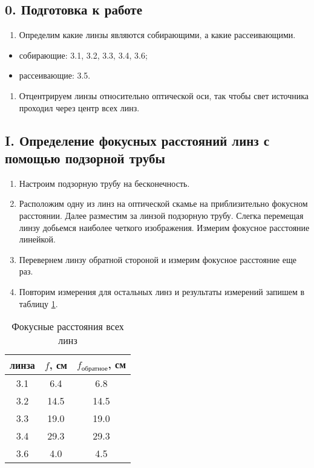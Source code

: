 \documentclass[a4paper,12pt]{article}
\begin{document}
\subsection*{0. Подготовка к работе}

\begin{enumerate}
    \item Определим какие линзы являются собирающими, а какие рассеивающими.
\end{enumerate}

\begin{itemize}
    \item собирающие: 3.1, 3.2, 3.3, 3.4, 3.6;
    \item рассеивающие: 3.5.
\end{itemize}

\begin{enumerate}[resume]
    \item Отцентрируем линзы относительно оптической оси, так чтобы свет источника проходил через центр всех линз.
\end{enumerate}


\subsection*{I. Определение фокусных расстояний линз с помощью подзорной трубы}

\begin{enumerate}
    \item Настроим подзорную трубу на бесконечность.
    \item Расположим одну из линз на оптической скамье на приблизительно фокусном расстоянии. Далее разместим за линзой подзорную трубу. Слегка перемещая линзу добьемся наиболее четкого изображения. Измерим фокусное расстояние линейкой.
    \item Перевернем линзу обратной стороной и измерим фокусное расстояние еще раз.
    \item Повторим измерения для остальных линз и результаты измерений запишем в таблицу \ref{table:1}.
\end{enumerate}


\begin{table}[!h]
	\caption{Фокусные расстояния всех линз}
	\label{table:1}	
	\begin{center}
		\begin{tabular}{|c|c|c|}
			\hline
			линза & $f$, см & $f_\text{обратное}$, см \\ \hline
			3.1	&	6.4 & 6.8 \\ \hline
			3.2	&	14.5 & 14.5 \\ \hline
			3.3	&	19.0 & 19.0 \\ \hline
			3.4	&	29.3 & 29.3 \\ \hline
			3.6	&	4.0 & 4.5 \\ \hline
		\end{tabular}
	\end{center}
\end{table}
\end{document}
